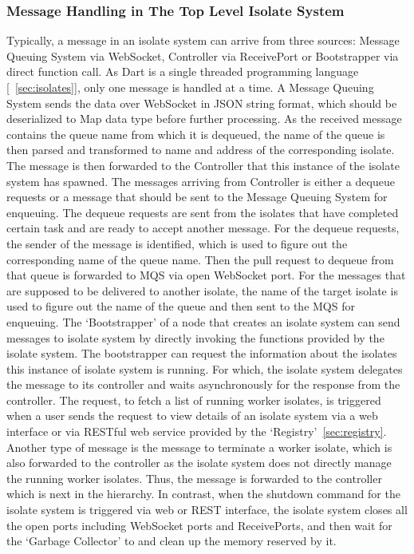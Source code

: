   \subsubsection{Message Handling in The Top Level Isolate System}
  Typically, a message in an isolate system can arrive from three sources: Message Queuing System via WebSocket, Controller via ReceivePort or Bootstrapper via direct function call. As Dart is a single threaded programming language [~\autoref{sec:isolates}], only one message is handled at a time.
  A Message Queuing System sends the data over WebSocket in JSON string format, which should be deserialized to Map data type before further processing. As the received message contains the queue name from which it is dequeued, the name of the queue is then parsed and transformed to name and address of the corresponding isolate. The message is then forwarded to the Controller that this instance of the isolate system has spawned.
  The messages arriving from Controller is either a dequeue requests or a message that should be sent to the Message Queuing System for enqueuing. The dequeue requests are sent from the isolates that have completed certain task and are ready to accept another message. For the dequeue requests, the sender of the message is identified, which is used to figure out the corresponding name of the queue name. Then the pull request to dequeue from that queue is forwarded to MQS via open WebSocket port. For the messages that are supposed to be delivered to another isolate, the name of the target isolate is used to figure out the name of the queue and then sent to the MQS for enqueuing.
  The ‘Bootstrapper’ of a node that creates an isolate system can send messages to isolate system by directly invoking the functions provided by the isolate system. The bootstrapper can request the information about the isolates this instance of isolate system is running. For which, the isolate system delegates the message to its controller and waits asynchronously for the response from the controller. The request, to fetch a list of running worker isolates, is triggered when a user sends the request to view details of an isolate system via a web interface or via RESTful web service provided by the ‘Registry’~\autoref{sec:registry}.
  Another type of message is the message to terminate a worker isolate, which is also forwarded to the controller as the isolate system does not directly manage the running worker isolates. Thus, the message is forwarded to the controller which is next in the hierarchy. In contrast, when the shutdown command for the isolate system is triggered via web or REST interface, the isolate system closes all the open ports including WebSocket ports and ReceivePorts, and then wait for the ‘Garbage Collector’ to and clean up the memory reserved by it.

